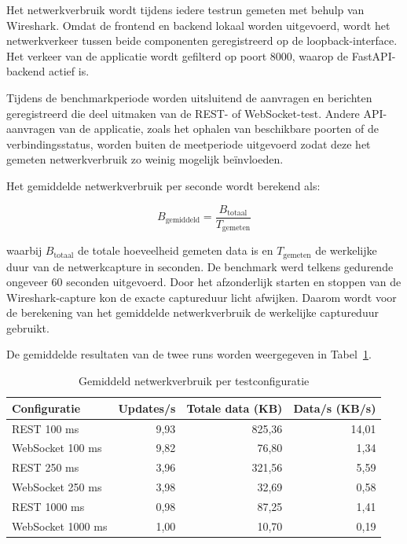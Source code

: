 Het netwerkverbruik wordt tijdens iedere testrun gemeten met behulp van
Wireshark. Omdat de frontend en backend lokaal worden uitgevoerd, wordt het
netwerkverkeer tussen beide componenten geregistreerd op de loopback-interface.
Het verkeer van de applicatie wordt gefilterd op poort 8000, waarop de
FastAPI-backend actief is.

Tijdens de benchmarkperiode worden uitsluitend de aanvragen en berichten
geregistreerd die deel uitmaken van de REST- of WebSocket-test. Andere
API-aanvragen van de applicatie, zoals het ophalen van beschikbare poorten of
de verbindingsstatus, worden buiten de meetperiode uitgevoerd zodat deze het
gemeten netwerkverbruik zo weinig mogelijk beïnvloeden.

Het gemiddelde netwerkverbruik per seconde wordt berekend als:

\begin{equation}
    B_{\text{gemiddeld}} =
    \frac{B_{\text{totaal}}}{T_{\text{gemeten}}}
\end{equation}

waarbij $B_{\text{totaal}}$ de totale hoeveelheid gemeten data is en
$T_{\text{gemeten}}$ de werkelijke duur van de netwerkcapture in seconden.
De benchmark werd telkens gedurende ongeveer 60 seconden uitgevoerd. Door het
afzonderlijk starten en stoppen van de Wireshark-capture kon de exacte
captureduur licht afwijken. Daarom wordt voor de berekening van het gemiddelde
netwerkverbruik de werkelijke captureduur gebruikt.

De gemiddelde resultaten van de twee runs worden weergegeven in
Tabel~\ref{tab:netwerk-resultaten}.

\begin{table}[H]
    \centering
    \caption{Gemiddeld netwerkverbruik per testconfiguratie}
    \label{tab:netwerk-resultaten}
    \begin{tabular}{lrrr}
        \hline
        \textbf{Configuratie} &
        \textbf{Updates/s} &
        \textbf{Totale data (KB)} &
        \textbf{Data/s (KB/s)} \\
        \hline
        REST 100 ms        & 9,93 & 825,36 & 14,01 \\
        WebSocket 100 ms   & 9,82 & 76,80  & 1,34 \\
        REST 250 ms        & 3,96 & 321,56 & 5,59 \\
        WebSocket 250 ms   & 3,98 & 32,69  & 0,58 \\
        REST 1000 ms       & 0,98 & 87,25  & 1,41 \\
        WebSocket 1000 ms  & 1,00 & 10,70  & 0,19 \\
        \hline
    \end{tabular}
\end{table}

